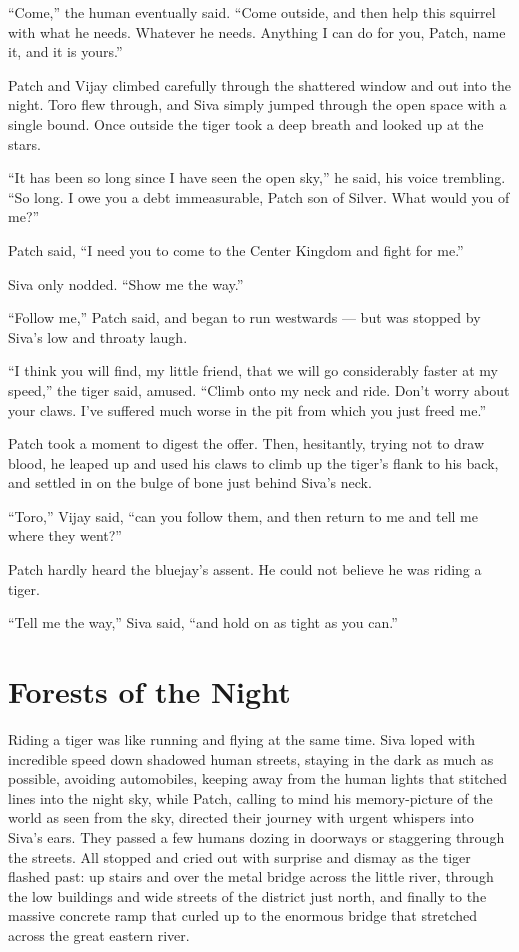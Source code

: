 \documentclass[12pt]{memoir}
\begin{document}
“Come,” the human eventually said. “Come outside, and then help this
squirrel with what he needs. Whatever he needs. Anything I can do for
you, Patch, name it, and it is yours.”

Patch and Vijay climbed carefully through the shattered window and out
into the night. Toro flew through, and Siva simply jumped through the
open space with a single bound. Once outside the tiger took a deep
breath and looked up at the stars.

“It has been so long since I have seen the open sky,” he said, his
voice trembling. “So long. I owe you a debt immeasurable, Patch son of
Silver. What would you of me?”

Patch said, “I need you to come to the Center Kingdom and fight for
me.”

Siva only nodded. “Show me the way.”

“Follow me,” Patch said, and began to run westwards — but was stopped
by Siva’s low and throaty laugh.

“I think you will find, my little friend, that we will go considerably
faster at my speed,” the tiger said, amused. “Climb onto my neck and
ride. Don’t worry about your claws. I’ve suffered much worse in the
pit from which you just freed me.”

Patch took a moment to digest the offer. Then, hesitantly, trying not
to draw blood, he leaped up and used his claws to climb up the tiger’s
flank to his back, and settled in on the bulge of bone just behind
Siva’s neck.

“Toro,” Vijay said, “can you follow them, and then return to me and
tell me where they went?”

Patch hardly heard the bluejay’s assent. He could not believe he was
riding a tiger.

“Tell me the way,” Siva said, “and hold on as tight as you can.”


\section{Forests of the Night}

Riding a tiger was like running and flying at the same time. Siva
loped with incredible speed down shadowed human streets, staying in
the dark as much as possible, avoiding automobiles, keeping away from
the human lights that stitched lines into the night sky, while Patch,
calling to mind his memory-picture of the world as seen from the sky,
directed their journey with urgent whispers into Siva’s ears. They
passed a few humans dozing in doorways or staggering through the
streets. All stopped and cried out with surprise and dismay as the
tiger flashed past: up stairs and over the metal bridge across the
little river, through the low buildings and wide streets of the
district just north, and finally to the massive concrete ramp that
curled up to the enormous bridge that stretched across the great
eastern river.
\end{document}
